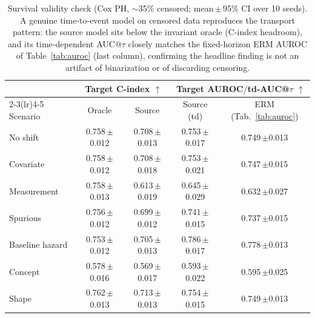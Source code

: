 \begin{table}[t]\centering\small
\setlength{\tabcolsep}{5pt}
\begin{tabular}{l cccc}
\toprule
& \multicolumn{2}{c}{Target C-index $\uparrow$} & \multicolumn{2}{c}{Target AUROC$/$td-AUC@$\tau$ $\uparrow$} \\
\cmidrule(lr){2-3}\cmidrule(lr){4-5}
Scenario & Oracle & Source & Source (td) & ERM (Tab.~\ref{tab:auroc}) \\
\midrule
No shift & 0.758\,{\small$\pm$0.012} & 0.708\,{\small$\pm$0.013} & 0.753\,{\small$\pm$0.017} & 0.749\,{\small$\pm$0.013} \\
Covariate & 0.758\,{\small$\pm$0.012} & 0.708\,{\small$\pm$0.018} & 0.753\,{\small$\pm$0.021} & 0.747\,{\small$\pm$0.015} \\
Measurement & 0.758\,{\small$\pm$0.013} & 0.613\,{\small$\pm$0.019} & 0.645\,{\small$\pm$0.029} & 0.632\,{\small$\pm$0.027} \\
Spurious & 0.756\,{\small$\pm$0.012} & 0.699\,{\small$\pm$0.012} & 0.741\,{\small$\pm$0.015} & 0.737\,{\small$\pm$0.015} \\
Baseline hazard & 0.753\,{\small$\pm$0.012} & 0.705\,{\small$\pm$0.013} & 0.786\,{\small$\pm$0.017} & 0.778\,{\small$\pm$0.013} \\
Concept & 0.578\,{\small$\pm$0.016} & 0.569\,{\small$\pm$0.017} & 0.593\,{\small$\pm$0.022} & 0.595\,{\small$\pm$0.025} \\
Shape & 0.762\,{\small$\pm$0.013} & 0.713\,{\small$\pm$0.013} & 0.754\,{\small$\pm$0.015} & 0.749\,{\small$\pm$0.013} \\
\bottomrule
\end{tabular}
\caption{Survival validity check (Cox PH, $\sim$35\% censored; mean\,$\pm$\,95\% CI over 10 seeds). A genuine time-to-event model on censored data reproduces the transport pattern: the source model sits below the invariant oracle (C-index headroom), and its time-dependent AUC@$\tau$ closely matches the fixed-horizon ERM AUROC of Table~\ref{tab:auroc} (last column), confirming the headline finding is not an artifact of binarization or of discarding censoring.}
\label{tab:survival}
\end{table}
